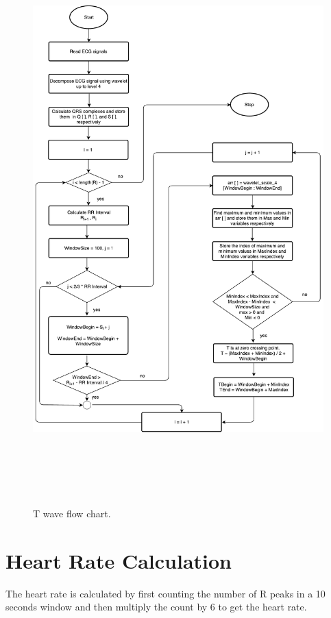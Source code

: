 \begin{figure}[htpb]
	\centering
	\includegraphics[width=25cm,height=22cm,keepaspectratio=true]{images/T_Wave.pdf}
	\caption{
		T wave flow chart.
	}
	\label{fig:t_peaks_flow_chart}
\end{figure}


\section{Heart Rate Calculation}
The heart rate is calculated by first counting the number of R peaks in a 10 seconds window and then multiply the count by 6 to get the heart rate.

